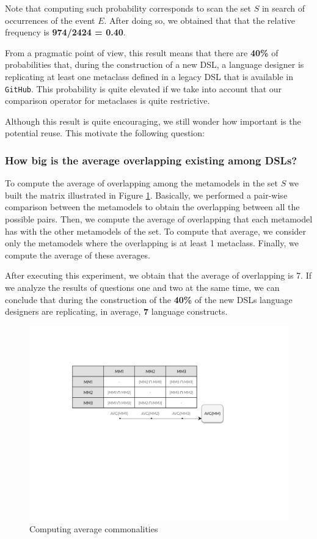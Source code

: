 Note that computing such probability corresponds to scan the set $S$ in search of occurrences of the event $E$. After doing so, we obtained that that the relative frequency is \textbf{974/2424 = 0.40}.

From a pragmatic point of view, this result means that there are \textbf{40\%} of probabilities that, during the construction of a new DSL, a language designer is replicating at least one metaclass defined in a legacy DSL that is available in \texttt{GitHub}. This probability is quite elevated if we take into account that our comparison operator for metaclases is quite restrictive.

Although this result is quite encouraging, we still wonder how important is the potential reuse. This motivate the following question:

\vspace{-3mm}
\subsubsection{How big is the average overlapping existing among DSLs?} To compute the average of overlapping among the metamodels in the set $S$ we built the matrix illustrated in Figure \ref{fig:matrix-evaluation}. Basically, we performed a pair-wise comparison between the metamodels to obtain the overlapping between all the possible pairs. Then, we compute the average of overlapping that each metamodel has with the other metamodels of the set. To compute that average, we consider only the metamodels where the overlapping is at least 1 metaclass. Finally, we compute the average of these averages.

After executing this experiment, we obtain that the average of overlapping is 7. If we analyze the results of questions one and two at the same time, we can conclude that during the construction of the \textbf{40\%} of the new DSLs language designers are replicating, in average, \textbf{7} language constructs.

\begin{figure}[h!]
\centering
\includegraphics[width=0.75\linewidth]{images/matrix-evaluation.pdf}
\caption{Computing average commonalities}
\label{fig:matrix-evaluation}
\end{figure}

